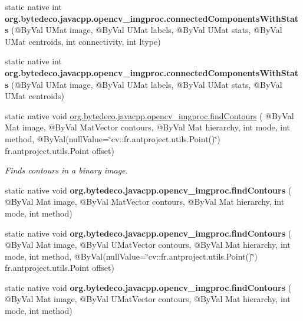 \begin{DoxyCompactItemize}
\mbox{\label{group__imgproc__shape_ga758d9571a7535f1ca26b646ed582b4e9}} 
static native int {\bfseries org.\+bytedeco.\+javacpp.\+opencv\+\_\+imgproc.\+connected\+Components\+With\+Stats} (@By\+Val U\+Mat image, @By\+Val U\+Mat labels, @By\+Val U\+Mat stats, @By\+Val U\+Mat centroids, int connectivity, int ltype)
\item 
\mbox{\label{group__imgproc__shape_gac47f114fe47546f5da3b8dc995c35db1}} 
static native int {\bfseries org.\+bytedeco.\+javacpp.\+opencv\+\_\+imgproc.\+connected\+Components\+With\+Stats} (@By\+Val U\+Mat image, @By\+Val U\+Mat labels, @By\+Val U\+Mat stats, @By\+Val U\+Mat centroids)
\item 
static native void \hyperlink{group__imgproc__shape_gad95c6aa001eb4a24cc898ff08dcb81da}{org.\+bytedeco.\+javacpp.\+opencv\+\_\+imgproc.\+find\+Contours} ( @By\+Val Mat image, @By\+Val Mat\+Vector contours, @By\+Val Mat hierarchy, int mode, int method, @By\+Val(null\+Value=\char`\"{}cv\+::\+fr.antproject.utils.Point()\char`\"{}) fr.antproject.utils.Point offset)
\begin{DoxyCompactList}\small\item\em Finds contours in a binary image. \end{DoxyCompactList}\item 
\mbox{\label{group__imgproc__shape_gaa4fa757d554fd45a740f5348bd3ee282}} 
static native void {\bfseries org.\+bytedeco.\+javacpp.\+opencv\+\_\+imgproc.\+find\+Contours} ( @By\+Val Mat image, @By\+Val Mat\+Vector contours, @By\+Val Mat hierarchy, int mode, int method)
\item 
\mbox{\label{group__imgproc__shape_gad9536bf2310f484d496884d21937ea79}} 
static native void {\bfseries org.\+bytedeco.\+javacpp.\+opencv\+\_\+imgproc.\+find\+Contours} ( @By\+Val Mat image, @By\+Val U\+Mat\+Vector contours, @By\+Val Mat hierarchy, int mode, int method, @By\+Val(null\+Value=\char`\"{}cv\+::\+fr.antproject.utils.Point()\char`\"{}) fr.antproject.utils.Point offset)
\item 
\mbox{\label{group__imgproc__shape_gaf0ff0f9dfae455c9440b756d598f4b2b}} 
static native void {\bfseries org.\+bytedeco.\+javacpp.\+opencv\+\_\+imgproc.\+find\+Contours} ( @By\+Val Mat image, @By\+Val U\+Mat\+Vector contours, @By\+Val Mat hierarchy, int mode, int method)

\end{DoxyCompactItemize}
